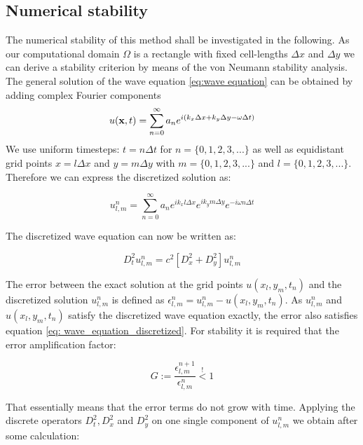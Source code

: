 \documentclass[fleqn,12pt]{NTFD} %
\begin{document}
\subsection{Numerical stability}

The numerical stability of this method shall be investigated in the following. As our computational domain $\Omega$ is a rectangle with fixed cell-lengths $\Delta x $ and $\Delta y$ we can derive a stability criterion by means of the von Neumann stability analysis. The general solution of the wave equation \ref{eq:wave equation} can be obtained by adding complex Fourier components 
\begin{equation} \label{fourierdecomp}
  u (\vb{x},t) =\sum_{n=0}^{\infty}  a_{n} e^{i(k_x  \Delta x + k_y \Delta y - \omega \Delta t)}
\end{equation} 
We use uniform timesteps: $t = n \Delta t $ for $n = \{0,1,2,3,...\}$ as well as equidistant grid points $x = l \Delta x $ and $y =m \Delta y $ with $m = \{0,1,2,3,...\}$ and $l = \{0,1,2,3,...\}$. \\
Therefore we can express the discretized solution as:

\begin{equation}
  u^n_{l,m} =\sum_{n=0}^{\infty}  a_{n} e^{ik_x l \Delta x} e^{ik_y m \Delta y}e^{ -i \omega n \Delta t}
\end{equation} 

The discretized wave equation can now be written as:

\begin{equation} \label{eq: wave_equation_discretized}
D^2_{t} u^n_{l,m} = c^2 [D^2_{x} + D^2_{y}] u^n_{l,m}
\end{equation} 


The error between the exact solution at the grid points $u(x_l, y_m, t_n)$  and the discretized solution $u^n_{l,m}$ is defined as $\epsilon^n_{l,m} = u^n_{l,m}  - u(x_l, y_m, t_n)$. As $u^n_{l,m}$ and $u(x_l, y_m, t_n)$ satisfy the discretized wave equation exactly, the error also  satisfies equation \ref{eq: wave_equation_discretized}.
For stability it is required that the error amplification factor:

\begin{equation} \label{eq:amplification factor}
 G := \frac{\epsilon^{n+1}_{l,m}}{\epsilon^n_{l,m}} \stackrel{!}{<} 1 
\end{equation}

That essentially means that the error terms do not grow with time.
Applying the discrete operators $D^2_{t}, D^2_{x}$ and $D^2_{y}$ on one single component of $u^n_{l,m}$ we obtain after some calculation:
\end{document}
